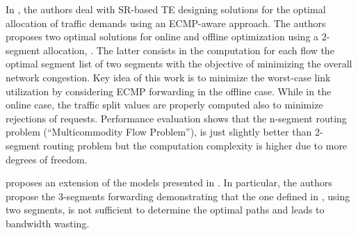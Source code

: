 In \cite{optimizedte}, the authors deal with SR-based TE designing solutions for the optimal allocation of traffic demands using an ECMP-aware approach. The authors proposes two optimal solutions for online and offline optimization using a 2-segment allocation, . The latter consists in the computation for each flow the optimal segment list of two segments with the objective of minimizing the overall network congestion. 
Key idea of this work is to minimize the worst-case link utilization by considering ECMP forwarding in the offline case. While in the online case, the traffic split values are properly computed also to minimize rejections of requests. Performance evaluation shows that the n-segment routing problem (``Multicommodity Flow Problem''), is just slightly better than 2-segment routing problem but the computation complexity is higher due to more degrees of freedom. 

\cite{roomi2018semi} proposes an extension of the models presented in \cite{optimizedte}. In particular, the authors propose the 3-segments forwarding demonstrating that the one defined in \cite{optimizedte}, using two segments, is not sufficient to determine the optimal paths and leads to bandwidth wasting. %

